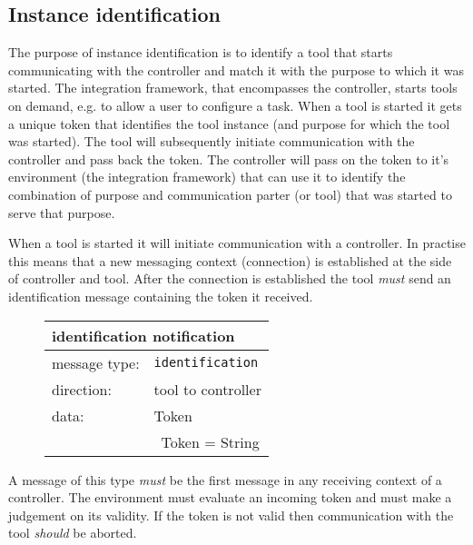 \documentclass{article}
\newcommand{\msg}[1]{\texttt{#1}}
\begin{document}
  \subsection{Instance identification} \label{s:instance_identification}

   The purpose of instance identification is to identify a tool that starts
   communicating with the controller and match it with the purpose to which it
   was started.  The integration framework, that encompasses the controller,
   starts tools on demand, e.g. to allow a user to configure a task. When a
   tool is started it gets a unique token that identifies the tool instance
   (and purpose for which the tool was started).  The tool will subsequently
   initiate communication with the controller and pass back the token. The
   controller will pass on the token to it's environment (the integration
   framework) that can use it to identify the combination of purpose and
   communication parter (or tool) that was started to serve that purpose.
   
   When a tool is started it will initiate communication with a controller.  In
   practise this means that a new messaging context (connection) is established
   at the side of controller and tool.  After the connection is established the
   tool \emph{must} send an identification message containing the token it
   received.
   
   \begin{figure}[H]
    \begin{center}
     \begin{tabular}{|ll|}
      \hline
       \multicolumn{2}{|l|}{\textbf{identification notification}} \\
      \hline
       message type:    & \msg{identification} \\
      \hline
       direction:       & tool to controller \\
       data:            & Token \\
                        & \ Token = String \\
      \hline
     \end{tabular}
     \vspace{-0.3cm}
    \end{center}
   \end{figure}

   \noindent A message of this type \emph{must} be the first message in any
   receiving context of a controller. The environment must evaluate an incoming
   token and must make a judgement on its validity. If the token is not valid
   then communication with the tool \emph{should} be aborted.
\end{document}
